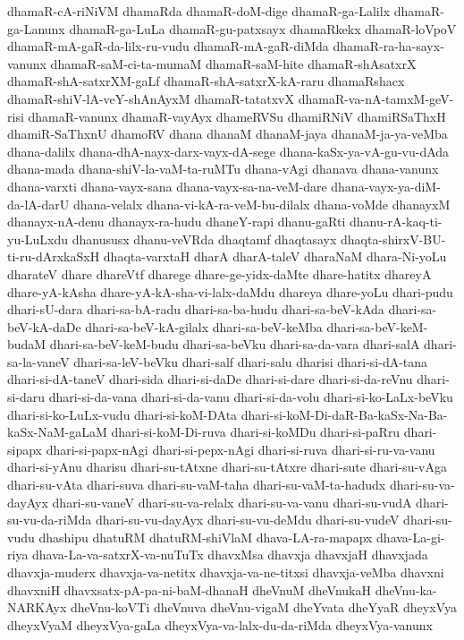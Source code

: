 {dhamaR-cA-riNiVM
dhamaRda
dhamaR-doM-dige
dhamaR-ga-Lalilx
dhamaR-ga-Lanunx
dhamaR-ga-LuLa
dhamaR-gu-patxsayx
dhamaRkekx
dhamaR-loVpoV
dhamaR-mA-gaR-da-lilx-ru-vudu
dhamaR-mA-gaR-diMda
dhamaR-ra-ha-sayx-vanunx
dhamaR-saM-ci-ta-mumaM
dhamaR-saM-hite
dhamaR-shAsatxrX
dhamaR-shA-satxrXM-gaLf
dhamaR-shA-satxrX-kA-raru
dhamaRshacx
dhamaR-shiV-lA-veY-shAnAyxM
dhamaR-tatatxvX
dhamaR-va-nA-tamxM-geV-risi
dhamaR-vanunx
dhamaR-vayAyx
dhameRVSu
dhamiRNiV
dhamiRSaThxH
dhamiR-SaThxnU
dhamoRV
dhana
dhanaM
dhanaM-jaya
dhanaM-ja-ya-veMba
dhana-dalilx
dhana-dhA-nayx-darx-vayx-dA-sege
dhana-kaSx-ya-vA-gu-vu-dAda
dhana-mada
dhana-shiV-la-vaM-ta-ruMTu
dhana-vAgi
dhanava
dhana-vanunx
dhana-varxti
dhana-vayx-sana
dhana-vayx-sa-na-veM-dare
dhana-vayx-ya-diM-da-lA-darU
dhana-velalx
dhana-vi-kA-ra-veM-bu-dilalx
dhana-voMde
dhanayxM
dhanayx-nA-denu
dhanayx-ra-hudu
dhaneY-rapi
dhanu-gaRti
dhanu-rA-kaq-ti-yu-LuLxdu
dhanususx
dhanu-veVRda
dhaqtamf
dhaqtasayx
dhaqta-shirxV-BU-ti-ru-dArxkaSxH
dhaqta-varxtaH
dharA
dharA-taleV
dharaNaM
dhara-Ni-yoLu
dharateV
dhare
dhareVtf
dharege
dhare-ge-yidx-daMte
dhare-hatitx
dhareyA
dhare-yA-kAsha
dhare-yA-kA-sha-vi-lalx-daMdu
dhareya
dhare-yoLu
dhari-pudu
dhari-sU-dara
dhari-sa-bA-radu
dhari-sa-ba-hudu
dhari-sa-beV-kAda
dhari-sa-beV-kA-daDe
dhari-sa-beV-kA-gilalx
dhari-sa-beV-keMba
dhari-sa-beV-keM-budaM
dhari-sa-beV-keM-budu
dhari-sa-beVku
dhari-sa-da-vara
dhari-salA
dhari-sa-la-vaneV
dhari-sa-leV-beVku
dhari-salf
dhari-salu
dharisi
dhari-si-dA-tana
dhari-si-dA-taneV
dhari-sida
dhari-si-daDe
dhari-si-dare
dhari-si-da-reVnu
dhari-si-daru
dhari-si-da-vana
dhari-si-da-vanu
dhari-si-da-volu
dhari-si-ko-LaLx-beVku
dhari-si-ko-LuLx-vudu
dhari-si-koM-DAta
dhari-si-koM-Di-daR-Ba-kaSx-Na-Ba-kaSx-NaM-gaLaM
dhari-si-koM-Di-ruva
dhari-si-koMDu
dhari-si-paRru
dhari-sipapx
dhari-si-papx-nAgi
dhari-si-pepx-nAgi
dhari-si-ruva
dhari-si-ru-va-vanu
dhari-si-yAnu
dharisu
dhari-su-tAtxne
dhari-su-tAtxre
dhari-sute
dhari-su-vAga
dhari-su-vAta
dhari-suva
dhari-su-vaM-taha
dhari-su-vaM-ta-hadudx
dhari-su-va-dayAyx
dhari-su-vaneV
dhari-su-va-relalx
dhari-su-va-vanu
dhari-su-vudA
dhari-su-vu-da-riMda
dhari-su-vu-dayAyx
dhari-su-vu-deMdu
dhari-su-vudeV
dhari-su-vudu
dhashipu
dhatuRM
dhatuRM-shiVlaM
dhava-LA-ra-mapapx
dhava-La-gi-riya
dhava-La-va-satxrX-va-nuTuTx
dhavxMsa
dhavxja
dhavxjaH
dhavxjada
dhavxja-muderx
dhavxja-va-netitx
dhavxja-va-ne-titxsi
dhavxja-veMba
dhavxni
dhavxniH
dhavxsatx-pA-pa-ni-baM-dhanaH
dheVnuM
dheVnukaH
dheVnu-ka-NARKAyx
dheVnu-koVTi
dheVnuva
dheVnu-vigaM
dheYvata
dheYyaR
dheyxVya
dheyxVyaM
dheyxVya-gaLa
dheyxVya-va-lalx-du-da-riMda
dheyxVya-vanunx
}
